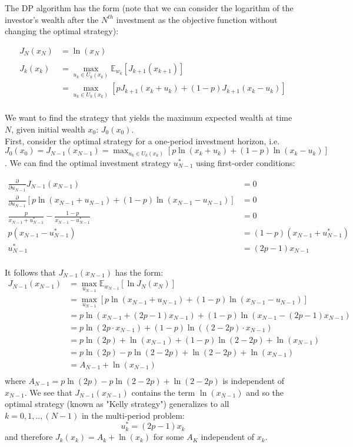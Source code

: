 \documentclass[11pt, oneside]{article}   	%
\begin{document}
The DP algorithm has the form (note that we can consider the logarithm of the investor's wealth after the $N^{th}$ investment as the objective function without changing the optimal strategy):

\begin{align*}
J_N(x_N) &= \ln(x_N)\\
\\
J_k(x_k) &=  \max_{u_k \in U_k(x_k)} \mathbb{E}_{w_k} \left[ J_{k+1} (x_{k+1}) \right]\\
&=  \max_{u_k \in U_k(x_k)} \left[ p J_{k+1} (x_k + u_k) + (1-p) J_{k+1} (x_k - u_k)\right]\\
\end{align*}

We want to find the strategy that yields the maximum expected wealth at time $N$, given initial wealth $x_0$: $J_0(x_0)$. \\ First, consider the optimal strategy for a one-period investment horizon, i.e. $J_0(x_0) = J_{N-1}(x_{N-1}) = \max_{u_k \in U_k(x_k)} \left[ p \ln (x_k + u_k) + (1-p) \ln (x_k - u_k)\right]$. We can find the optimal investment strategy $u_{N-1}^*$ using first-order conditions:

\begin{align*}
\frac{\partial}{\partial u_{N-1}} J_{N-1}(x_{N-1}) &= 0\\
\frac{\partial}{\partial u_{N-1}} \left[ p \ln (x_{N-1} + u_{N-1}) + (1-p) \ln (x_{N-1} - u_{N-1})\right] &= 0\\
\frac{p}{x_{N-1} + u_{N-1}^*} - \frac{1-p}{x_{N-1} - u_{N-1}^*} &= 0\\
p(x_{N-1} - u_{N-1}^*) &= (1-p)(x_{N-1} + u_{N-1}^*)\\
u_{N-1}^* &= (2p-1)x_{N-1}\\
\end{align*}

It follows that $J_{N-1}(x_{N-1})$ has the form:
\begin{align*}
J_{N-1}(x_{N-1}) &=  \max_{u_{N-1}} \mathbb{E}_{w_{N-1}} \left[\ln J_{N} (x_{N}) \right]\\
&=  \max_{u_{N-1}} \left[ p \ln (x_{N-1} + u_{N-1}) + (1-p) \ln (x_{N-1} - u_{N-1})\right]\\
&=  p \ln (x_{N-1} + (2p-1)x_{N-1}) + (1-p) \ln (x_{N-1} - (2p-1)x_{N-1})\\
&=  p \ln (2p \cdot x_{N-1}) + (1-p) \ln ((2-2p) \cdot x_{N-1})\\
&=  p \ln (2p) + \ln(x_{N-1}) + (1-p) \ln (2-2p) + \ln(x_{N-1})\\
&=  p \ln (2p) - p\ln (2-2p) + \ln (2-2p) + \ln(x_{N-1})\\
&=  A_{N-1} + \ln(x_{N-1})\\
\end{align*}
where $A_{N-1} = p \ln (2p) - p\ln (2-2p) + \ln (2-2p)$ is independent of $x_{N-1}$. We see that $J_{N-1}(x_{N-1})$ contains the term $\ln(x_{N-1})$ and so the optimal strategy (known as "Kelly strategy") generalizes to all $k=0,1,..,(N-1)$ in the multi-period problem:
$$u_{k}^* = (2p-1)x_{k}$$
and therefore $J_k(x_k) = A_{k} + \ln(x_{k})$ for some $A_K$ independent of $x_k$.
\end{document}
